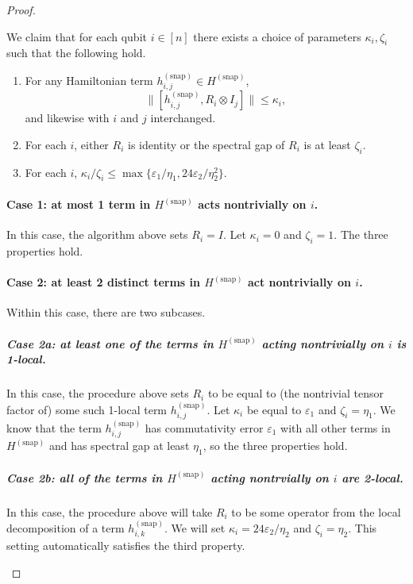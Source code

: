 \documentclass[11pt]{article}
\theoremstyle{plain}
\newcommand{\eps}{\varepsilon}
\newcommand{\snp}{{(\mathrm{snap})}}
\begin{document}
\begin{proof}
\begin{enumerate}
\begin{enumerate}
    \end{enumerate}
    We claim that for each qubit $i \in [n]$ there exists a choice of parameters $\kappa_i, \zeta_i$ such that the following hold.
    \begin{enumerate}
        \item[1.] For any Hamiltonian term $h^\snp_{i,j} \in H^\snp$,
        \[ \|[ h^\snp_{i,j}, R_i \otimes I_j] \| \leq \kappa_i, \]
        and likewise with $i$ and $j$ interchanged.
        \item[2.] For each $i$, either $R_i$ is identity or the spectral gap of $R_i$ is at least $\zeta_i$.
        \item[3.] For each $i$, $\kappa_i/\zeta_i \leq \max\{ \eps_1 /\eta_1, 24\eps_2/\eta_2^2\}$.
    \end{enumerate}
    
    \paragraph{Case 1: at most 1 term in $H^\snp$ acts nontrivially on $i$.} In this case, the algorithm above sets $R_i = I$. Let $\kappa_i = 0$ and $\zeta_i = 1$. The three properties hold.


\paragraph{Case 2: at least 2 distinct terms in $H^\snp$ act nontrivially on $i$.}

Within this case, there are two subcases.

\subparagraph{Case 2a: at least one of the terms in $H^\snp$ acting nontrivially on $i$ is 1-local.}

In this case, the procedure above sets $R_i$ to be equal to (the nontrivial tensor factor of) some such 1-local term $h^\snp_{i,j}$. Let $\kappa_i$ be equal to $\eps_1$ and $\zeta_i = \eta_1$. We know that the term $h^\snp_{i,j}$ has commutativity error $\eps_1$ with all other terms in $H^\snp$ and has spectral gap at least $\eta_1$, so the three properties hold.

\subparagraph{Case 2b: all of the terms in $H^\snp$ acting nontrvially on $i$ are 2-local.}

In this case, the procedure above will take $R_i$ to be some operator from the local decomposition of a term $h^\snp_{i,k}$. We will set $\kappa_i = 24\eps_2/\eta_2$ and $\zeta_i = \eta_2$. This setting automatically satisfies the third property.


\end{enumerate}
\end{proof}
\end{document}
